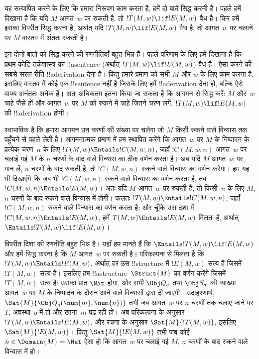 \documentclass[../../../include/open-logic-section]{subfiles}
\begin{document}

\begin{explain}
यह सत्यापित करने के लिए कि हमारा निरूपण काम करता है, हमें दो बातें
सिद्ध करनी हैं। पहले हमें दिखाना है कि यदि $M$ आगत~$w$ पर रुकती है, तो
$!T(M, w) \lif !E(M, w)$ वैध है। फिर हमें इसका विपरीत सिद्ध करना है,
अर्थात् यदि $!T(M, w) \lif !E(M, w)$ वैध है, तो आगत~$w$ पर चलाने पर
$M$ वास्तव में अंततः रुकती है।

इन दोनों बातों को सिद्ध करने की रणनीतियाँ बहुत भिन्न हैं। पहले परिणाम
के लिए हमें दिखाना है कि प्रथम-कोटि तर्कशास्त्र का !!a{sentence}
(अर्थात् $!T(M, w) \lif !E(M, w)$) वैध है। ऐसा करने की सबसे सरल रीति
!!a{derivation} देना है। किंतु हमारे प्रमाण को सभी $M$ और $w$ के लिए
काम करना है, इसलिए वास्तव में कोई एक !!{sentence} नहीं है जिसके लिए
हमें !!a{derivation} देना हो, बल्कि ऐसे वाक्य अनंततः अनेक हैं।
अतः अधिकतम इतना किया जा सकता है कि आगमन से सिद्ध करें: $M$ और~$w$ चाहे
जैसे हों और आगत~$w$ पर $M$ को रुकने में चाहे जितने चरण लगें,
$!T(M, w) \lif !E(M, w)$ की !!a{derivation} होगी।

स्वाभाविक है कि हमारा आगमन उन चरणों की संख्या पर चलेगा जो $M$ किसी
रुकने वाले विन्यास तक पहुँचने से पहले लेती है। आगमनात्मक प्रमाण में हम
स्थापित करेंगे कि आगत~$w$ पर $M$ के निष्पादन के प्रत्येक चरण~$n$ के लिए
$!T(M, w) \Entails !C(M, w, n)$, जहाँ $!C(M, w, n)$ आगत~$w$ पर चलाई
गई $M$ के $n$ चरणों के बाद वाले विन्यास का ठीक वर्णन करता है। अब यदि
$M$ आगत~$w$ पर, मान लें, $n$ चरणों के बाद रुकती है, तो $!C(M, w, n)$
रुकने वाले विन्यास का वर्णन करेगा। हम यह भी दिखाएँगे कि जब भी
$!C(M, w, n)$ रुकने वाले विन्यास का वर्णन करता है, तब
$!C(M, w, n) \Entails !E(M, w)$। अतः यदि $M$ आगत~$w$ पर रुकती है, तो
किसी~$n$ के लिए $M$, $n$ चरणों के बाद रुकने वाले विन्यास में होगी। फलतः
$!T(M, w) \Entails !C(M, w, n)$, जहाँ $!C(M, w, n)$ रुकने वाले विन्यास
का वर्णन करता है; और चूँकि उस दशा में
$!C(M, w, n) \Entails !E(M, w)$, हमें $T(M, w) \Entails !E(M, w)$
मिलता है, अर्थात् $\Entails !T(M, w) \lif !E(M, w)$।

विपरीत दिशा की रणनीति बहुत भिन्न है। यहाँ हम मानते हैं कि
$\Entails !T(M, w) \lif !E(M, w)$ और हमें सिद्ध करना है कि $M$
आगत~$w$ पर रुकती है। परिकल्पना से मिलता है कि
$!T(M, w) \Entails !E(M, w)$, अर्थात् हर उस !!{structure} में
$!E(M, w)$ सत्य है जिसमें $!T(M, w)$ सत्य है। इसलिए हम
!!a{structure}~$\Struct{M}$ का वर्णन करेंगे जिसमें $!T(M, w)$ सत्य है:
उसका प्रांत $\Nat$ होगा, और सभी $\Obj Q_q$ तथा $\Obj S_\sigma$ की
व्याख्या आगत~$w$ पर $M$ के निष्पादन के दौरान आने वाले विन्यासों द्वारा
दी जाएगी। उदाहरणार्थ, $\Sat{M}{\Obj Q_q(\num{m}, \num{n})}$ तभी जब
आगत~$w$ पर $n$ चरणों तक चलाए जाने पर $T$, अवस्था~$q$ में हो और
खाना~$m$ पढ़ रही हो। अब परिकल्पना के अनुसार
$!T(M, w) \Entails !E(M, w)$, और रचना के अनुसार
$\Sat{M}{!T(M, w)}$, इसलिए $\Sat{M}{!E(M, w)}$। किंतु
$\Sat{M}{!E(M, w)}$ तभी जब कोई $n \in \Domain{M} = \Nat$ ऐसा हो कि
आगत~$w$ पर चलाई गई $M$, $n$ चरणों के बाद रुकने वाले विन्यास में हो।
\end{explain}
\end{document}

